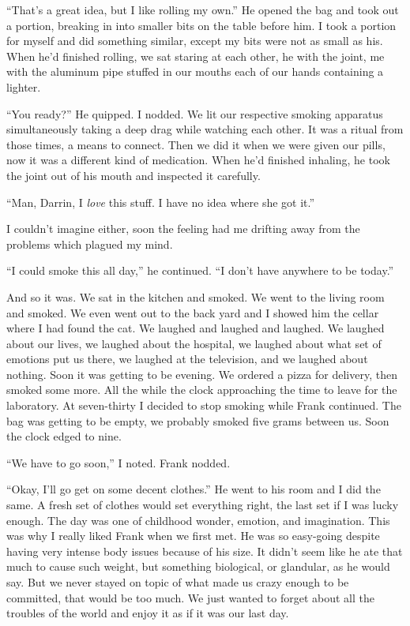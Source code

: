 \documentclass[
]{article}
\begin{document}
``That's a great idea, but I like rolling my own.'' He opened the bag
and took out a portion, breaking in into smaller bits on the table
before him. I took a portion for myself and did something similar,
except my bits were not as small as his. When he'd finished rolling, we
sat staring at each other, he with the joint, me with the aluminum pipe
stuffed in our mouths each of our hands containing a lighter.

``You ready?'' He quipped. I nodded. We lit our respective smoking
apparatus simultaneously taking a deep drag while watching each other.
It was a ritual from those times, a means to connect. Then we did it
when we were given our pills, now it was a different kind of medication.
When he'd finished inhaling, he took the joint out of his mouth and
inspected it carefully.

``Man, Darrin, I \emph{love} this stuff. I have no idea where she got
it.''

I couldn't imagine either, soon the feeling had me drifting away from
the problems which plagued my mind.

``I could smoke this all day,'' he continued. ``I don't have anywhere to
be today.''

And so it was. We sat in the kitchen and smoked. We went to the living
room and smoked. We even went out to the back yard and I showed him the
cellar where I had found the cat. We laughed and laughed and laughed. We
laughed about our lives, we laughed about the hospital, we laughed about
what set of emotions put us there, we laughed at the television, and we
laughed about nothing. Soon it was getting to be evening. We ordered a
pizza for delivery, then smoked some more. All the while the clock
approaching the time to leave for the laboratory. At seven-thirty I
decided to stop smoking while Frank continued. The bag was getting to be
empty, we probably smoked five grams between us. Soon the clock edged to
nine.

``We have to go soon,'' I noted. Frank nodded.

``Okay, I'll go get on some decent clothes.'' He went to his room and I
did the same. A fresh set of clothes would set everything right, the
last set if I was lucky enough. The day was one of childhood wonder,
emotion, and imagination. This was why I really liked Frank when we
first met. He was so easy-going despite having very intense body issues
because of his size. It didn't seem like he ate that much to cause such
weight, but something biological, or glandular, as he would say. But we
never stayed on topic of what made us crazy enough to be committed, that
would be too much. We just wanted to forget about all the troubles of
the world and enjoy it as if it was our last day.
\end{document}
